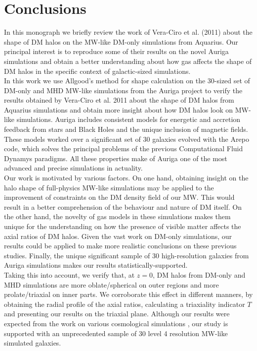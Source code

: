 \chapter{Conclusions}


In this monograph we briefly review the work of Vera-Ciro et al. (2011) \cite{Vera Ciro 2011} about the shape of DM halos on the MW-like DM-only simulations from Aquarius. Our principal interest is to reproduce some of their results on the novel Auriga simulations and obtain a better understanding about how gas affects the shape of DM halos in the specific context of galactic-sized simulations.\\

In this work we use Allgood's method for shape calculation on the 30-sized set of DM-only and MHD MW-like simulations from the Auriga project to verify the results obtained by Vera-Ciro et al. 2011 about the shape of DM halos from Aquarius simulations and obtain more insight about how DM halos look on MW-like simulations. Auriga includes consistent models for energetic and accretion feedback from stars and Black Holes and the unique inclusion of magnetic fields. These models worked over a significant set of 30 galaxies evolved with the Arepo code, which solves the principal problems of the previous Computational Fluid Dynamys paradigms. All these properties make of Auriga one of the most advanced and precise simulations in actuality.\\ 

Our work is motivated by various factors. On one hand, obtaining insight on the halo shape of full-physics MW-like simulations may be applied to the improvement of constraints on the DM density field of our MW. This would result in a better comprehension of the behaviour and nature of DM itself. On the other hand, the novelty of gas models in these simulations makes them unique for the understanding on how the presence of visible matter affects the axial ratios of DM halos. Given the vast work on DM-only simulations, our results could be applied to make more realistic conclusions on these previous studies. Finally, the unique significant sample of 30 high-resolution galaxies from Auriga simulations makes our results statistically-supported.\\  

Taking this into account, we verify that, at $z=0$, DM halos from DM-only and MHD simulations are more oblate/spherical on outer regions and more prolate/triaxial on inner parts. We corroborate this effect in different manners, by obtaining the radial profile of the axial ratios, calculating a triaxiality indicator $T$ and presenting our results on the triaxial plane. Although our results were expected from the work on various cosmological simulations \cite{various}, our study is supported with an unprecedented sample of 30 level 4 resolution MW-like simulated galaxies.\\

